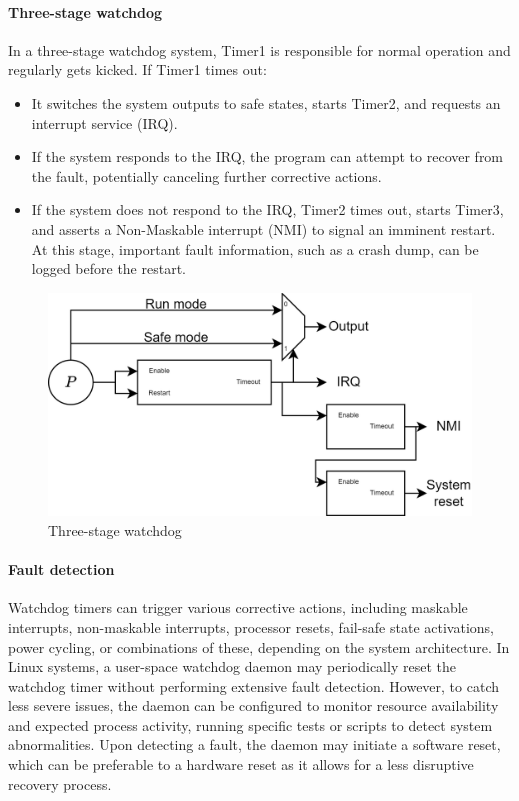 \paragraph*{Three-stage watchdog}
In a three-stage watchdog system, Timer1 is responsible for normal operation and regularly gets kicked. 
If Timer1 times out:
\begin{itemize}
    \item It switches the system outputs to safe states, starts Timer2, and requests an interrupt service (IRQ).
    \item If the system responds to the IRQ, the program can attempt to recover from the fault, potentially canceling further corrective actions.
    \item If the system does not respond to the IRQ, Timer2 times out, starts Timer3, and asserts a Non-Maskable interrupt (NMI) to signal an imminent restart. 
        At this stage, important fault information, such as a crash dump, can be logged before the restart.
\end{itemize}
\begin{figure}[H]
    \centering
    \includegraphics[width=0.75\linewidth]{images/wdog3.png}
    \caption{Three-stage watchdog}
\end{figure}

\paragraph*{Fault detection}
Watchdog timers can trigger various corrective actions, including maskable interrupts, non-maskable interrupts, processor resets, fail-safe state activations, power cycling, or combinations of these, depending on the system architecture.
In Linux systems, a user-space watchdog daemon may periodically reset the watchdog timer without performing extensive fault detection. 
However, to catch less severe issues, the daemon can be configured to monitor resource availability and expected process activity, running specific tests or scripts to detect system abnormalities.
Upon detecting a fault, the daemon may initiate a software reset, which can be preferable to a hardware reset as it allows for a less disruptive recovery process.

